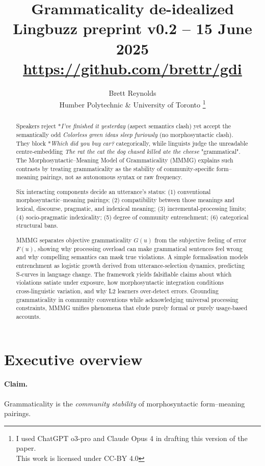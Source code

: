 \documentclass[12pt]{article}
\title{Grammaticality de-idealized\\[4pt]
       \large Lingbuzz preprint v0.2 – 15 June 2025\\[6pt]
       \normalsize \url{https://github.com/brettr/gdi}}
\author{Brett Reynolds \orcidlink{0000-0003-0073-7195}\\Humber Polytechnic \& University of Toronto
\thanks{I used ChatGPT o3-pro and Claude Opus 4 in drafting this version of the paper.\\This work is licensed under CC-BY 4.0}}
\date{}
\begin{document}
\maketitle

\begin{abstract}
\small
Speakers reject *\textit{I've finished it yesterday} (aspect semantics clash) yet accept the semantically odd \textit{Colorless green ideas sleep furiously} (no morphosyntactic clash). They block *\textit{Which did you buy car?} categorically, while linguists judge the unreadable centre‑embedding \textit{The rat the cat the dog chased killed ate the cheese} "grammatical".  
The Morphosyntactic–Meaning Model of Grammaticality (MMMG) explains such contrasts by treating grammaticality as the stability of community‑specific form–meaning pairings, not as autonomous syntax or raw frequency.

Six interacting components decide an utterance's status:  
(1) conventional morphosyntactic--meaning pairings;  
(2) compatibility between those meanings and lexical, discourse, pragmatic, and indexical meaning;  
(3) incremental‑processing limits;  
(4) socio‑pragmatic indexicality;  
(5) degree of community entrenchment;  
(6) categorical structural bans.

MMMG separates objective grammaticality \(G(u)\) from the subjective feeling of error \(F(u)\), showing why processing overload can make grammatical sentences feel wrong and why compelling semantics can mask true violations.  
A simple formalisation models entrenchment as logistic growth derived from utterance-selection dynamics, predicting S‑curves in language change. The framework yields falsifiable claims about which violations satiate under exposure, how morphosyntactic integration conditions cross‑linguistic variation, and why L2 learners over‑detect errors.  
Grounding grammaticality in community conventions while acknowledging universal processing constraints, MMMG unifies phenomena that elude purely formal or purely usage‑based accounts.
\end{abstract}

\section{Executive overview}

\paragraph*{Claim.}%
Grammaticality is the \emph{community stability} of morphosyntactic form–meaning pairings.
\end{document}
